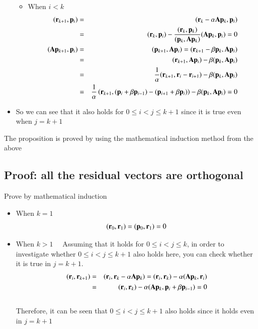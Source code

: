 \begin{itemize}
\begin {itemize}
\item When $i<k$ \ \
\begin{eqnarray}
(\mathbf{r}_{k+1},\mathbf{p}_i)
&=&  (\mathbf{r}_k-\alpha\mathbf{A}\mathbf{p}_k,\mathbf{p}_i)\\
&=& (\mathbf{r}_k,\mathbf{p}_i)-\frac{(\mathbf{r}_k,\mathbf{p}_k)}{(\mathbf{p}_k,\mathbf{A}\mathbf{p}_k)}(\mathbf{A}\mathbf{p}_k,\mathbf{p}_i)=0\\
(\mathbf{A}\mathbf{p}_{k+1},\mathbf{p}_i)
&=&  (\mathbf{p}_{k+1},\mathbf{A}\mathbf{p}_i)  =  (\mathbf{r}_{k+1}-\beta\mathbf{p}_k,\mathbf{A}\mathbf{p}_i)  \\
&=&  (\mathbf{r}_{k+1},\mathbf{A}\mathbf{p}_i)-\beta(\mathbf{p}_k,\mathbf{A}\mathbf{p}_i)\\
&=&   \frac{1}{\alpha}(\mathbf{r}_{k+1},\mathbf{r}_i-\mathbf{r}_{i+1})-\beta(\mathbf{p}_k,\mathbf{A}\mathbf{p}_i)\\
&=&  \frac{1}{\alpha}\left(\mathbf{r}_{k+1},(\mathbf{p}_i+\beta\mathbf{p}_{i-1})-(\mathbf{p}_{i+1}+\beta\mathbf{p}_i)\right)-\beta(\mathbf{p}_k,\mathbf{A}\mathbf{p}_i)=0
\end{eqnarray}
\end {itemize}

\item So we can see that it also holds for $0\le{i}<{j}\le{k+1}$ since it is true even when $j=k+1$
\end {itemize}

The proposition is proved by using the mathematical induction method from the above



\subsection{Proof: all the residual vectors are orthogonal}


Prove by mathematical induction
\begin {itemize}
\item When $k=1$ \\
\begin{equation}
(\mathbf{r}_0,\mathbf{r}_1)=(\mathbf{p}_0,\mathbf{r}_1)=0
\end{equation}
\item When $k>1$ \ \
Assuming that it holds for $0\le{i}<{j}\le{k}$, in order to investigate whether $0\le{i}<{j}\le{k+1}$ also holds here, you can check whether it is true in $j=k+1$. \\
\begin{eqnarray}
(\mathbf{r}_i,\mathbf{r}_{k+1})
&=&  (\mathbf{r}_i,\mathbf{r}_k-\alpha\mathbf{A}\mathbf{p}_k)  =  (\mathbf{r}_i,\mathbf{r}_k)-\alpha(\mathbf{A}\mathbf{p}_k,\mathbf{r}_i)\\
&=&  (\mathbf{r}_i,\mathbf{r}_k)-\alpha(\mathbf{A}\mathbf{p}_k,\mathbf{p}_i+\beta\mathbf{p}_{i-1})  =  0
\end{eqnarray}\\
Therefore, it can be seen that $0\le{i}<{j}\le{k+1}$ also holds since it holds even in $j=k+1$
\end {itemize}

